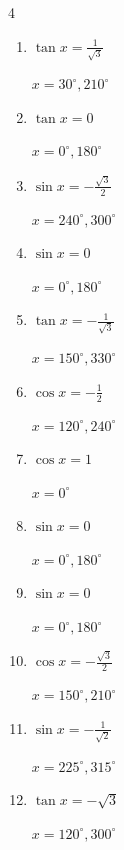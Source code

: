 \begin{multicols}{4}
\begin{enumerate}
  \item $\displaystyle \tan{x}  = \frac{1}{\sqrt{3}}$

        $\displaystyle x = 30^{\circ} , 210^{\circ}$

  \item $\displaystyle \tan{x}  = 0$

        $\displaystyle x = 0^{\circ} , 180^{\circ}$

  \item $\displaystyle \sin{x}  = -\frac{\sqrt{3}}{2}$

        $\displaystyle x = 240^{\circ} , 300^{\circ}$

  \item $\displaystyle \sin{x}  = 0$

        $\displaystyle x = 0^{\circ} , 180^{\circ}$

  \item $\displaystyle \tan{x}  = -\frac{1}{\sqrt{3}}$

        $\displaystyle x = 150^{\circ} , 330^{\circ}$

  \item $\displaystyle \cos{x}  = -\frac{1}{2}$

        $\displaystyle x = 120^{\circ} , 240^{\circ}$

  \item $\displaystyle \cos{x}  = 1$

        $\displaystyle x = 0^{\circ}$

  \item $\displaystyle \sin{x}  = 0$

        $\displaystyle x = 0^{\circ} , 180^{\circ}$

  \item $\displaystyle \sin{x}  = 0$

        $\displaystyle x = 0^{\circ} , 180^{\circ}$

  \item $\displaystyle \cos{x}  = -\frac{\sqrt{3}}{2}$

        $\displaystyle x = 150^{\circ} , 210^{\circ}$

  \item $\displaystyle \sin{x}  = -\frac{1}{\sqrt{2}}$

        $\displaystyle x = 225^{\circ} , 315^{\circ}$

  \item $\displaystyle \tan{x}  = -\sqrt{3}$

        $\displaystyle x = 120^{\circ} , 300^{\circ}$


\end{enumerate}
\end{multicols}
